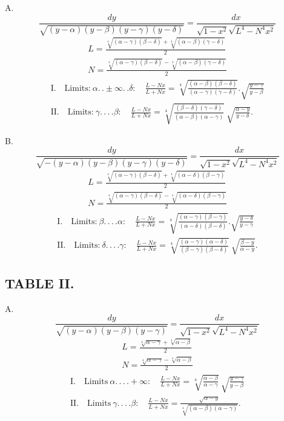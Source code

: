 \documentclass{article}
\begin{document}
A.
\[
\frac{dy}{\sqrt{(y-\alpha)(y-\beta)(y-\gamma)(y-\delta)}}=\frac{dx}{\sqrt{1-x^{2}}\sqrt{L^{4}-N^{4}x^{2}}}
\]
\[
\begin{gathered}
L=\frac{\sqrt[4]{(\alpha-\gamma)(\beta-\delta)}+\sqrt[4]{(\alpha-\beta)(\gamma-\delta)}}{2}\\
N=\frac{\sqrt[4]{(\alpha-\gamma)(\beta-\delta)}-\sqrt[4]{(\alpha-\beta)(\gamma-\delta)}}{2}
\end{gathered}
\]
\[
\begin{gathered}
\text{I.}\quad\text{Limits:}\ \alpha.\,.\pm\infty.\,.\delta:\quad\frac{L-Nx}{L+Nx}=\sqrt[4]{\frac{(\alpha-\beta)(\beta-\delta)}{(\alpha-\gamma)(\gamma-\delta)}}.\sqrt{\frac{y-\gamma}{y-\beta}}\\
\text{II.}\quad\text{Limits:}\ \gamma.\,.\,.\,.\beta:\quad\frac{L-Nx}{L+Nx}=\sqrt[4]{\frac{(\beta-\delta)(\gamma-\delta)}{(\alpha-\beta)(\alpha-\gamma)}}\ \sqrt{\frac{\alpha-y}{y-\delta}}.
\end{gathered}
\]

B.
\[
\frac{dy}{\sqrt{-(y-\alpha)(y-\beta)(y-\gamma)(y-\delta)}}=\frac{dx}{\sqrt{1-x^{2}}\sqrt{L^{4}-N^{4}x^{2}}}
\]
\[
\begin{gathered}
L=\frac{\sqrt[4]{(\alpha-\gamma)(\beta-\delta)}+\sqrt[4]{(\alpha-\delta)(\beta-\gamma)}}{2}\\
N=\frac{\sqrt[4]{(\alpha-\gamma)(\beta-\delta)}-\sqrt[4]{(\alpha-\delta)(\beta-\gamma)}}{2}
\end{gathered}
\]
\[
\begin{gathered}
\text{I.}\quad\text{Limits:}\ \beta.\,.\,.\,.\alpha:\quad\frac{L-Nx}{L+Nx}=\sqrt[4]{\frac{(\alpha-\gamma)(\beta-\gamma)}{(\alpha-\delta)(\beta-\delta)}}.\sqrt{\frac{y-\delta}{y-\gamma}}\\
\text{II.}\quad\text{Limits:}\ \delta.\,.\,.\,.\gamma:\quad\frac{L-Nx}{L+Nx}=\sqrt[4]{\frac{(\alpha-\gamma)(\alpha-\delta)}{(\beta-\gamma)(\beta-\delta)}}\ \sqrt{\frac{\beta-y}{\alpha-y}}.
\end{gathered}
\]


\subsection*{TABLE II.}

A.
\[
\frac{dy}{\sqrt{(y-\alpha)(y-\beta)(y-\gamma)}}=\frac{dx}{\sqrt{1-x^{2}}\sqrt{L^{4}-N^{4}x^{2}}}
\]
\[
\begin{gathered}
L=\frac{\sqrt[4]{\alpha-\gamma}+\sqrt[4]{\alpha-\beta}}{2}\\
N=\frac{\sqrt[4]{\alpha-\gamma}-\sqrt[4]{\alpha-\beta}}{2}
\end{gathered}
\]
\[
\begin{gathered}
\text{I.}\quad\text{Limits}\ \alpha.\,.\,.\,.+\infty:\quad\frac{L-Nx}{L+Nx}=\sqrt[4]{\frac{\alpha-\beta}{\alpha-\gamma}}\ \sqrt{\frac{y-\gamma}{y-\beta}}\\
\text{II.}\quad\text{Limits}\ \gamma.\,.\,.\,.\beta:\quad\frac{L-Nx}{L+Nx}=\frac{\sqrt{\alpha-y}}{\sqrt[4]{(\alpha-\beta)(\alpha-\gamma)}}.
\end{gathered}
\]
\end{document}
